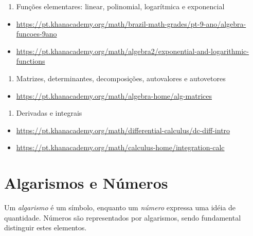 \documentclass[
]{book}
\providecommand{\tightlist}{%
  \setlength{\itemsep}{0pt}\setlength{\parskip}{0pt}}
\theoremstyle{definition}
\theoremstyle{definition}
\theoremstyle{definition}
\theoremstyle{remark}
\begin{document}
\begin{enumerate}
\def\labelenumi{\arabic{enumi}.}
\setcounter{enumi}{3}
\tightlist
\item
  Funções elementares: linear, polinomial, logarítmica e exponencial
\end{enumerate}

\begin{itemize}
\tightlist
\item
  \url{https://pt.khanacademy.org/math/brazil-math-grades/pt-9-ano/algebra-funcoes-9ano}~\\
\item
  \url{https://pt.khanacademy.org/math/algebra2/exponential-and-logarithmic-functions}
\end{itemize}

\begin{enumerate}
\def\labelenumi{\arabic{enumi}.}
\setcounter{enumi}{4}
\tightlist
\item
  Matrizes, determinantes, decomposições, autovalores e autovetores
\end{enumerate}

\begin{itemize}
\tightlist
\item
  \url{https://pt.khanacademy.org/math/algebra-home/alg-matrices}
\end{itemize}

\begin{enumerate}
\def\labelenumi{\arabic{enumi}.}
\setcounter{enumi}{5}
\tightlist
\item
  Derivadas e integrais
\end{enumerate}

\begin{itemize}
\tightlist
\item
  \url{https://pt.khanacademy.org/math/differential-calculus/dc-diff-intro}~\\
\item
  \url{https://pt.khanacademy.org/math/calculus-home/integration-calc}
\end{itemize}

\hypertarget{algarismos-e-numeros}{%
\section{Algarismos e Números}\label{algarismos-e-numeros}}

Um \emph{algarismo} é um símbolo, enquanto um \emph{número} expressa uma idéia de quantidade. Números são representados por algarismos, sendo fundamental distinguir estes elementos.
\end{document}
